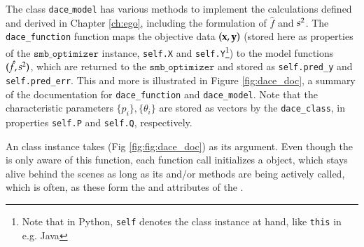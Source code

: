 The class \texttt{dace$\_$model} has various methods to implement the calculations defined and derived in Chapter \ref{ch:ego}, including the formulation of $\hat{f}$ and $s^2$. The \texttt{dace\_function} function maps the objective data $(\mathbf{x},\mathbf{y})$ (stored here as properties of the $\texttt{smb\_optimizer}$ instance, \texttt{self.X} and \texttt{self.Y}\footnote{Note that in Python, \texttt{self} denotes the class instance at hand, like \texttt{this} in e.g. Java}) to the model functions $(\hat{f},s^2)$, which are returned to the $\texttt{smb\_optimizer}$ and stored as \texttt{self.pred\_y} and \texttt{self.pred\_err}. This and more is illustrated in Figure \ref{fig:dace_doc}, a summary of the documentation for \texttt{dace\_function} and \texttt{dace\_model}. Note that the characteristic parameters $\{p_i\},\{\theta_i\}$ are stored as vectors by the \texttt{dace\_class}, in properties \texttt{self.P} and \texttt{self.Q}, respectively.



\begin{minipage}{\textwidth}
\begin{framed}

\end{framed}

 \label{fig:dace_doc}

\end{minipage}

An  class instance takes  (Fig \ref{fig:fig:dace_doc}) as its  argument. Even though the  is only aware of this function, each function call initializes a  object, which stays alive behind the scenes as long as its  and/or  methods are being actively called, which is often, as these form the  and  attributes of the .


